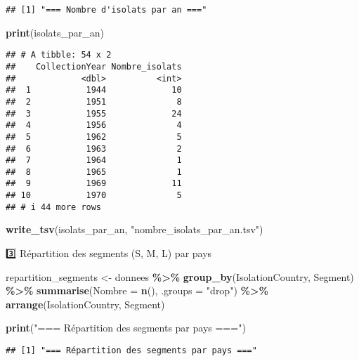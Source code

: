 \documentclass[
]{article}
\newenvironment{Shaded}{\begin{snugshade}}{\end{snugshade}}
\newcommand{\AttributeTok}[1]{\textcolor[rgb]{0.13,0.29,0.53}{#1}}
\newcommand{\FunctionTok}[1]{\textcolor[rgb]{0.13,0.29,0.53}{\textbf{#1}}}
\newcommand{\NormalTok}[1]{#1}
\newcommand{\OtherTok}[1]{\textcolor[rgb]{0.56,0.35,0.01}{#1}}
\newcommand{\SpecialCharTok}[1]{\textcolor[rgb]{0.81,0.36,0.00}{\textbf{#1}}}
\newcommand{\StringTok}[1]{\textcolor[rgb]{0.31,0.60,0.02}{#1}}
\begin{document}
\begin{verbatim}
## [1] "=== Nombre d'isolats par an ==="
\end{verbatim}

\begin{Shaded}
\begin{Highlighting}[]
\FunctionTok{print}\NormalTok{(isolats\_par\_an)}
\end{Highlighting}
\end{Shaded}

\begin{verbatim}
## # A tibble: 54 x 2
##    CollectionYear Nombre_isolats
##             <dbl>          <int>
##  1           1944             10
##  2           1951              8
##  3           1955             24
##  4           1956              4
##  5           1962              5
##  6           1963              2
##  7           1964              1
##  8           1965              1
##  9           1969             11
## 10           1970              5
## # i 44 more rows
\end{verbatim}

\begin{Shaded}
\begin{Highlighting}[]
\FunctionTok{write\_tsv}\NormalTok{(isolats\_par\_an, }\StringTok{"nombre\_isolats\_par\_an.tsv"}\NormalTok{)}
\end{Highlighting}
\end{Shaded}

3️⃣ Répartition des segments (S, M, L) par pays

\begin{Shaded}
\begin{Highlighting}[]
\NormalTok{repartition\_segments }\OtherTok{\textless{}{-}}\NormalTok{ donnees }\SpecialCharTok{\%\textgreater{}\%}
  \FunctionTok{group\_by}\NormalTok{(IsolationCountry, Segment) }\SpecialCharTok{\%\textgreater{}\%}
  \FunctionTok{summarise}\NormalTok{(}\AttributeTok{Nombre =} \FunctionTok{n}\NormalTok{(), }\AttributeTok{.groups =} \StringTok{"drop"}\NormalTok{) }\SpecialCharTok{\%\textgreater{}\%}
  \FunctionTok{arrange}\NormalTok{(IsolationCountry, Segment)}

\FunctionTok{print}\NormalTok{(}\StringTok{"=== Répartition des segments par pays ==="}\NormalTok{)}
\end{Highlighting}
\end{Shaded}

\begin{verbatim}
## [1] "=== Répartition des segments par pays ==="
\end{verbatim}
\end{document}
